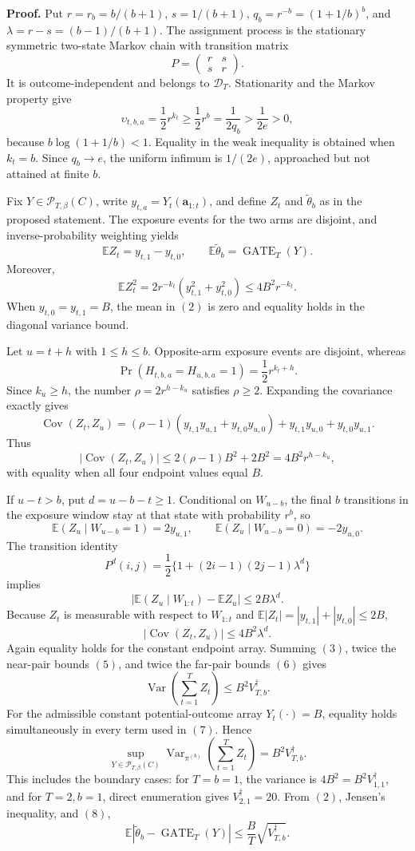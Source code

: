 \textbf{Proof.} Put \(r=r_b=b/(b+1)\), \(s=1/(b+1)\), \(q_b=r^{-b}=(1+1/b)^b\), and \(\lambda=r-s=(b-1)/(b+1)\). The assignment process is the stationary symmetric two-state Markov chain with transition matrix
\[
P=\begin{pmatrix}r&s\\s&r\end{pmatrix}.
\]
It is outcome-independent and belongs to \(\mathcal D_T\). Stationarity and the Markov property give
\[
\upsilon_{t,b,a}=\frac12r^{k_t}\ge\frac12r^b=\frac{1}{2q_b}>\frac{1}{2e}>0,
\tag{1}
\]
because \(b\log(1+1/b)<1\). Equality in the weak inequality is obtained when \(k_t=b\). Since \(q_b\to e\), the uniform infimum is \(1/(2e)\), approached but not attained at finite \(b\).

Fix \(Y\in\mathcal P_{T,\beta}(C)\), write \(y_{t,a}=Y_t(\mathbf a_{1:t})\), and define \(Z_t\) and \(\widetilde\theta_b\) as in the proposed statement. The exposure events for the two arms are disjoint, and inverse-probability weighting yields
\[
\mathbb EZ_t=y_{t,1}-y_{t,0},\qquad \mathbb E\widetilde\theta_b=\operatorname{GATE}_T(Y).
\tag{2}
\]
Moreover,
\[
\mathbb EZ_t^2=2r^{-k_t}(y_{t,1}^2+y_{t,0}^2)\le4B^2r^{-k_t}.
\tag{3}
\]
When \(y_{t,0}=y_{t,1}=B\), the mean in \((2)\) is zero and equality holds in the diagonal variance bound.

Let \(u=t+h\) with \(1\le h\le b\). Opposite-arm exposure events are disjoint, whereas
\[
\Pr(H_{t,b,a}=H_{u,b,a}=1)=\frac12r^{k_t+h}.
\]
Since \(k_u\ge h\), the number \(\rho=2r^{h-k_u}\) satisfies \(\rho\ge2\). Expanding the covariance exactly gives
\[
\operatorname{Cov}(Z_t,Z_u)=(\rho-1)(y_{t,1}y_{u,1}+y_{t,0}y_{u,0})+y_{t,1}y_{u,0}+y_{t,0}y_{u,1}.
\tag{4}
\]
Thus
\[
|\operatorname{Cov}(Z_t,Z_u)|\le2(\rho-1)B^2+2B^2=4B^2r^{h-k_u},
\tag{5}
\]
with equality when all four endpoint values equal \(B\).

If \(u-t>b\), put \(d=u-b-t\ge1\). Conditional on \(W_{u-b}\), the final \(b\) transitions in the exposure window stay at that state with probability \(r^b\), so
\[
\mathbb E(Z_u\mid W_{u-b}=1)=2y_{u,1},\qquad \mathbb E(Z_u\mid W_{u-b}=0)=-2y_{u,0}.
\]
The transition identity
\[
P^d(i,j)=\frac12\{1+(2i-1)(2j-1)\lambda^d\}
\]
implies
\[
\left|\mathbb E(Z_u\mid W_{1:t})-\mathbb EZ_u\right|\le2B\lambda^d.
\]
Because \(Z_t\) is measurable with respect to \(W_{1:t}\) and \(\mathbb E|Z_t|=|y_{t,1}|+|y_{t,0}|\le2B\),
\[
|\operatorname{Cov}(Z_t,Z_u)|\le4B^2\lambda^d.
\tag{6}
\]
Again equality holds for the constant endpoint array. Summing \((3)\), twice the near-pair bounds \((5)\), and twice the far-pair bounds \((6)\) gives
\[
\operatorname{Var}\!\left(\sum_{t=1}^TZ_t\right)\le B^2V_{T,b}^{\dagger}.
\tag{7}
\]
For the admissible constant potential-outcome array \(Y_t(\cdot)=B\), equality holds simultaneously in every term used in \((7)\). Hence
\[
\sup_{Y\in\mathcal P_{T,\beta}(C)}\operatorname{Var}_{\pi^{(b)}}\!\left(\sum_{t=1}^TZ_t\right)=B^2V_{T,b}^{\dagger}.
\tag{8}
\]
This includes the boundary cases: for \(T=b=1\), the variance is \(4B^2=B^2V_{1,1}^{\dagger}\), and for \(T=2,b=1\), direct enumeration gives \(V_{2,1}^{\dagger}=20\). From \((2)\), Jensen's inequality, and \((8)\),
\[
\mathbb E|\widetilde\theta_b-\operatorname{GATE}_T(Y)|\le\frac BT\sqrt{V_{T,b}^{\dagger}}.
\tag{9}
\]

